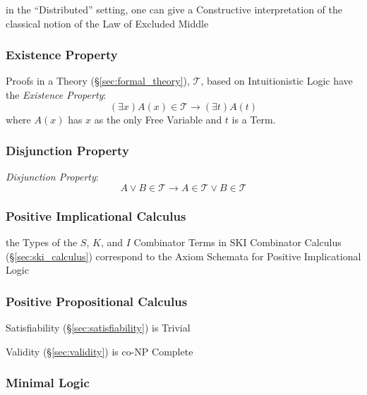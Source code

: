 in the ``Distributed'' setting, one can give a Constructive interpretation of
the classical notion of the Law of Excluded Middle



\subsubsection{Existence Property}\label{sec:existence_property}

Proofs in a Theory (\S\ref{sec:formal_theory}), $\mathcal{T}$, based
on Intuitionistic Logic have the \emph{Existence Property}:
\[
  (\exists x)A(x) \in \mathcal{T} \rightarrow (\exists t)A(t)
\]
where $A(x)$ has $x$ as the only Free Variable and $t$ is a Term.



\subsubsection{Disjunction Property}\label{sec:disjunction_property}

\emph{Disjunction Property}:
\[
  A \vee B \in \mathcal{T}
  \rightarrow A \in \mathcal{T} \vee B \in \mathcal{T}
\]



\subsubsection{Positive Implicational Calculus}
\label{sec:positive_implicational}

the Types of the $S$, $K$, and $I$ Combinator Terms in SKI Combinator
Calculus (\S\ref{sec:ski_calculus}) correspond to the Axiom Schemata
for Positive Implicational Logic



\subsubsection{Positive Propositional Calculus}
\label{sec:positive_propositional}

Satisfiability (\S\ref{sec:satisfiability}) is Trivial

Validity (\S\ref{sec:validity}) is co-NP Complete %



\subsubsection{Minimal Logic}\label{sec:minimal_logic}

